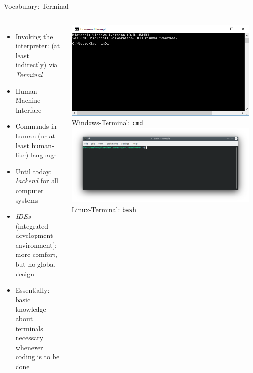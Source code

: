 \begin{frame}{Vocabulary: Terminal}
%
\begin{columns}[T]
\begin{itemize}
\item Invoking the interpreter: (at least indirectly) via \emph{Terminal}
\item Human-Machine-Interface
\item Commands in human (or at least human-like) language
\item Until today: \emph{backend} for all computer systems
\item \emph{IDEs} (integrated development environment): more comfort, but no global design
\item Essentially: basic knowledge about terminals necessary whenever coding is to be done
\end{itemize}
%
\includegraphics[width=\linewidth]{./gfx/cmd}
{\tiny Windows-Terminal: \texttt{cmd}}
\includegraphics[width=\linewidth]{./gfx/bash}
{\tiny Linux-Terminal: \texttt{bash}}
\end{columns}
%
\end{frame}



